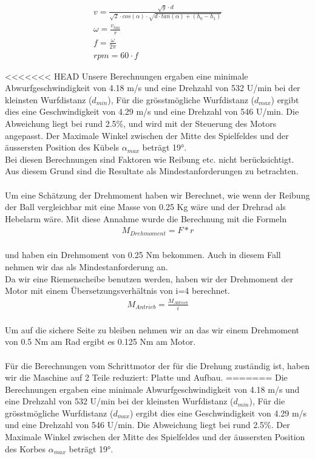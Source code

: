 \begin{gather}
	v=\frac{\sqrt{g} \cdot d}{\sqrt{2} \cdot cos(\alpha) \cdot \sqrt{d \cdot tan(\alpha)+(h_0-h_1)}}\\
	\omega=\frac{v_{tan}}{r}\\
	f=\frac{\omega}{2\pi}\\
	rpm=60 \cdot f
\end{gather}

<<<<<<< HEAD
Unsere Berechnungen ergaben eine minimale Abwurfgeschwindigkeit von 4.18 m/s und eine Drehzahl von 532 U/min bei der kleinsten Wurfdistanz ($d_{min}$), 
Für die grösstmögliche Wurfdistanz ($d_{max}$) ergibt dies  eine Geschwindigkeit von 4.29 m/s und eine Drehzahl von 546 U/min. 
Die Abweichung liegt bei rund 2.5\%, und wird mit der Steuerung des Motors angepasst.
Der Maximale Winkel zwischen der Mitte des Spielfeldes und der äussersten Position des Kübels $\alpha_{max}$ beträgt 19°. \\
Bei diesen Berechnungen sind Faktoren wie Reibung etc. nicht berücksichtigt. Aus diesem Grund sind die Resultate als Mindestanforderungen zu betrachten.\\ \\
Um eine Schätzung der Drehmoment haben wir Berechnet, wie wenn der Reibung der Ball vergleichbar mit eine Masse von 0.25 Kg wäre und der Drehrad als Hebelarm wäre. Mit diese Annahme wurde die Berechnung mit die Formeln\\
\begin{gather}
	M_{Drehmoment}=F*r
\end{gather}\\
und haben ein Drehmoment von 0.25 Nm bekommen. Auch in diesem Fall nehmen wir das als Mindestanforderung an.\\
Da wir eine Riemenscheibe benutzen werden, haben wir der Drehmoment der Motor mit einem Übersetzungsverhältnis von i=4 berechnet.\\
\begin{gather}
	M_{Antrieb}=\frac{M_{Abtrieb}}{i}
\end{gather}\\
Um auf die sichere Seite zu bleiben nehmen wir an das wir einem Drehmoment von 0.5 Nm am Rad ergibt es 0.125 Nm am Motor.\\ \\
Für die Berechnungen vom Schrittmotor der für die Drehung zuständig ist, haben wir die Maschine auf 2 Teile reduziert: Platte und Aufbau.
=======
Die Berechnungen ergaben eine minimale Abwurfgeschwindigkeit von 4.18 m/s und eine Drehzahl von 532 U/min bei der kleinsten Wurfdistanz ($d_{min}$), 
Für die grösstmögliche Wurfdistanz ($d_{max}$) ergibt dies eine Geschwindigkeit von 4.29 m/s und eine Drehzahl von 546 U/min. 
Die Abweichung liegt bei rund 2.5\%.
Der Maximale Winkel zwischen der Mitte des Spielfeldes und der äussersten Position des Korbes $\alpha_{max}$ beträgt 19°.

